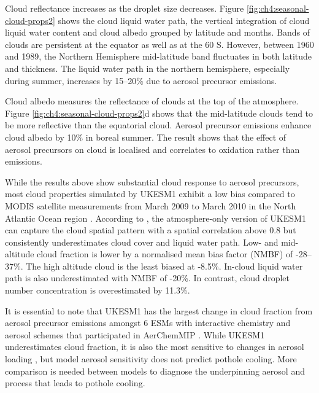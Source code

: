Cloud reflectance increases as the droplet size decreases. Figure \ref{fig:ch4:seasonal-cloud-props2} shows the cloud liquid water path, the vertical integration of cloud liquid water content and cloud albedo grouped by latitude and months. Bands of clouds are persistent at the equator as well as at the 60 \textdegree S. However, between 1960 and 1989, the Northern Hemisphere mid-latitude band fluctuates in both latitude and thickness. The liquid water path in the northern hemisphere, especially during summer, increases by 15--20\% due to aerosol precursor emissions. 

Cloud albedo measures the reflectance of clouds at the top of the atmosphere. Figure \ref{fig:ch4:seasonal-cloud-props2}d shows that the mid-latitude clouds tend to be more reflective than the equatorial cloud. Aerosol precursor emissions enhance cloud albedo by 10\% in boreal summer. The result shows that the effect of aerosol precursors on cloud is localised and correlates to  oxidation rather than emissions.


While the results above show substantial cloud response to aerosol precursors, most cloud properties simulated by UKESM1 exhibit a low bias compared to MODIS satellite measurements from March 2009 to March 2010 in the North Atlantic Ocean region \citep{grosvenorDecompositionCloudAerosol2020}. According to \citet{grosvenorDecompositionCloudAerosol2020}, the atmosphere-only version of UKESM1 can capture the cloud spatial pattern with a spatial correlation above 0.8 but consistently underestimates cloud cover and liquid water path. Low- and mid-altitude cloud fraction is lower by a normalised mean bias factor (NMBF) of -28--37\%. The high altitude cloud is the least biased at -8.5\%. In-cloud liquid water path is also underestimated with NMBF of -20\%. In contrast, cloud droplet number concentration is overestimated by 11.3\%.


It is essential to note that UKESM1 has the largest change in cloud fraction from aerosol precursor emissions amongst 6 ESMs with interactive chemistry and aerosol schemes that participated in AerChemMIP \citep{zhangRoleAnthropogenicAerosols2021}. While UKESM1 underestimates cloud fraction, it is also the most sensitive to changes in aerosol loading \citep{zhangRoleAnthropogenicAerosols2021}, but model aerosol sensitivity does not predict pothole cooling. More comparison is needed between models to diagnose the underpinning aerosol and process that leads to pothole cooling. 


